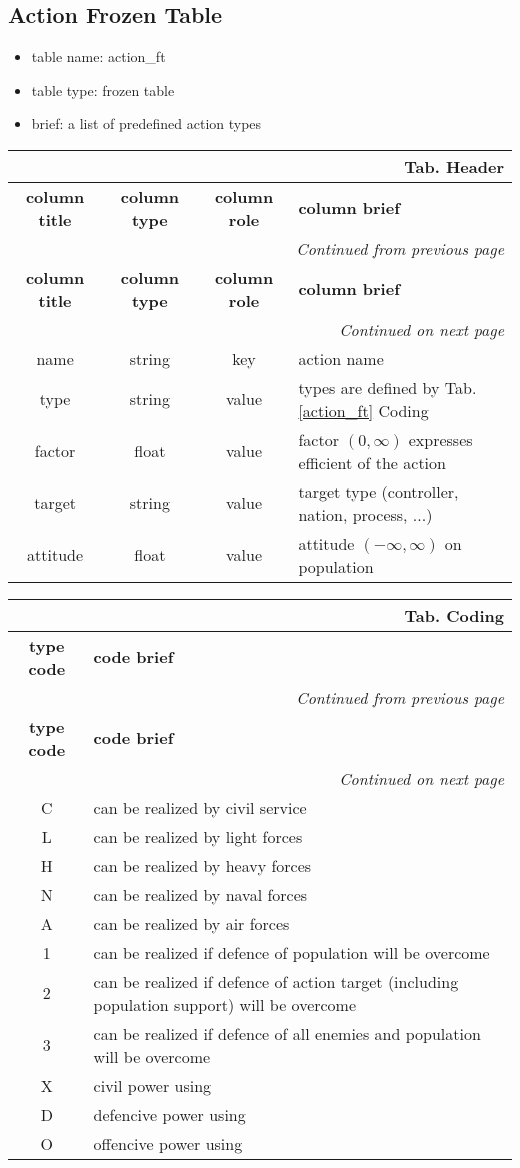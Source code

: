 \documentclass[a4paper,oneside,titlepage]{report}
\newcommand*{\LTHeaderII}[3]{
  \multicolumn{2}{r}{\textbf{Tab. \thesubsection} \textbf{#1}}\\    
  \hline
  \textbf{#2} & \textbf{#3}\\
  \hline

  \endfirsthead
  \multicolumn{2}{r}{\textit{Continued from previous page}}\\    
  \hline
  \textbf{#2} & \textbf{#3}\\
  \hline
  \endhead
  \hline
  \multicolumn{2}{r}{\textit{Continued on next page}}\\
  \endfoot
  \hline
  \endlastfoot  
}
\newcommand*{\LTHeaderIV}[5]{
  \multicolumn{4}{r}{\textbf{Tab. \thesubsection} \textbf{#1}}\\    
  \hline
  \textbf{#2} & \textbf{#3} & \textbf{#4} & \textbf{#5}\\
  \hline
  
  \endfirsthead
  \multicolumn{4}{r}{\textit{Continued from previous page}}\\    
  \hline
  \textbf{#2} & \textbf{#3} & \textbf{#4} & \textbf{#5}\\
  \hline
  \endhead
  \hline
  \multicolumn{4}{r}{\textit{Continued on next page}}\\
  \endfoot
  \hline
  \endlastfoot  
}
\begin{document}
\subsection{Action Frozen Table}
\begin{itemize}
  \setlength{\itemsep}{0pt}
  \setlength{\parskip}{0pt}
\item table name: action\_ft  
\item table type: frozen table   
\item brief: a list of predefined action types
\end{itemize}
\label{action_ft}

\vspace{-0.5cm}
\begin{longtable}{|c|c|c|l|}  
  \LTHeaderIV{Header}{column title}{column type}{column role}{column brief}                    
  name & string & key & action name\\
  type & string & value & types are defined by Tab. \ref{action_ft} Coding\\
  factor & float & value & factor $(0, \infty)$ expresses efficient of the action\\
  target & string & value & target type (controller, nation, process, ...)\\
  attitude & float & value & attitude $(-\infty, \infty)$ on population  \\
\end{longtable}

\vspace{-0.5cm}
\begin{longtable}{ |c|l| } 
  \LTHeaderII{Coding}{type code}{code brief} 
  C & can be realized by civil service \\
  L & can be realized by light forces \\
  H & can be realized by heavy forces \\
  N & can be realized by naval forces \\
  A & can be realized by air forces \\
  \hline
  1 & can be realized if defence of population will be overcome\\
  2 & can be realized if defence of action target (including population support) will be overcome\\
  3 & can be realized if defence of all enemies and population will be overcome\\
  \hline
  X & civil power using\\
  D & defencive power using\\
  O & offencive power using\\
\end{longtable}
\end{document}
